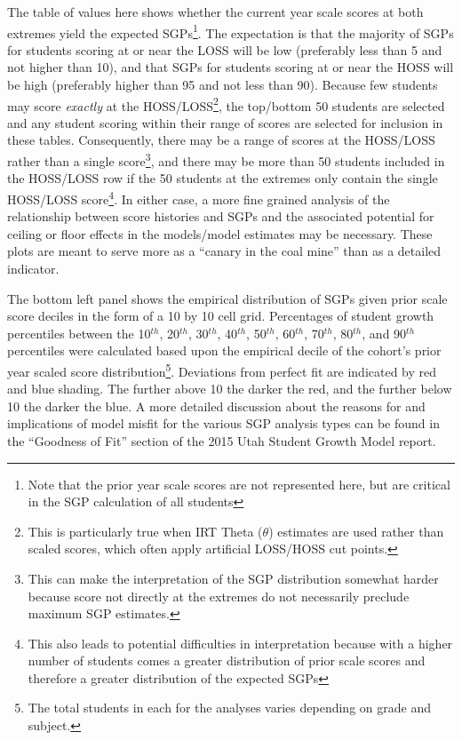 \documentclass[12pt]{article}
\begin{document}
The table of values here shows whether the current year scale scores at
both extremes yield the expected SGPs\footnote{Note that the prior year
  scale scores are not represented here, but are critical in the SGP
  calculation of all students}. The expectation is that the majority of
SGPs for students scoring at or near the LOSS will be low (preferably
less than 5 and not higher than 10), and that SGPs for students scoring
at or near the HOSS will be high (preferably higher than 95 and not less
than 90). Because few students may score \emph{exactly} at the
HOSS/LOSS\footnote{This is particularly true when IRT Theta (\(\theta\))
  estimates are used rather than scaled scores, which often apply
  artificial LOSS/HOSS cut points.}, the top/bottom 50 students are
selected and any student scoring within their range of scores are
selected for inclusion in these tables. Consequently, there may be a
range of scores at the HOSS/LOSS rather than a single score\footnote{This
  can make the interpretation of the SGP distribution somewhat harder
  because score not directly at the extremes do not necessarily preclude
  maximum SGP estimates.}, and there may be more than 50 students
included in the HOSS/LOSS row if the 50 students at the extremes only
contain the single HOSS/LOSS score\footnote{This also leads to potential
  difficulties in interpretation because with a higher number of
  students comes a greater distribution of prior scale scores and
  therefore a greater distribution of the expected SGPs}. In either
case, a more fine grained analysis of the relationship between score
histories and SGPs and the associated potential for ceiling or floor
effects in the models/model estimates may be necessary. These plots are
meant to serve more as a ``canary in the coal mine'' than as a detailed
indicator.

The bottom left panel shows the empirical distribution of SGPs given
prior scale score deciles in the form of a 10 by 10 cell grid.
Percentages of student growth percentiles between the 10\(^{th}\),
20\(^{th}\), 30\(^{th}\), 40\(^{th}\), 50\(^{th}\), 60\(^{th}\),
70\(^{th}\), 80\(^{th}\), and 90\(^{th}\) percentiles were calculated
based upon the empirical decile of the cohort's prior year scaled score
distribution\footnote{The total students in each for the analyses varies
  depending on grade and subject.}. Deviations from perfect fit are
indicated by red and blue shading. The further above 10 the darker the
red, and the further below 10 the darker the blue. A more detailed
discussion about the reasons for and implications of model misfit for
the various SGP analysis types can be found in the ``Goodness of Fit''
section of the 2015 Utah Student Growth Model report.
\end{document}
